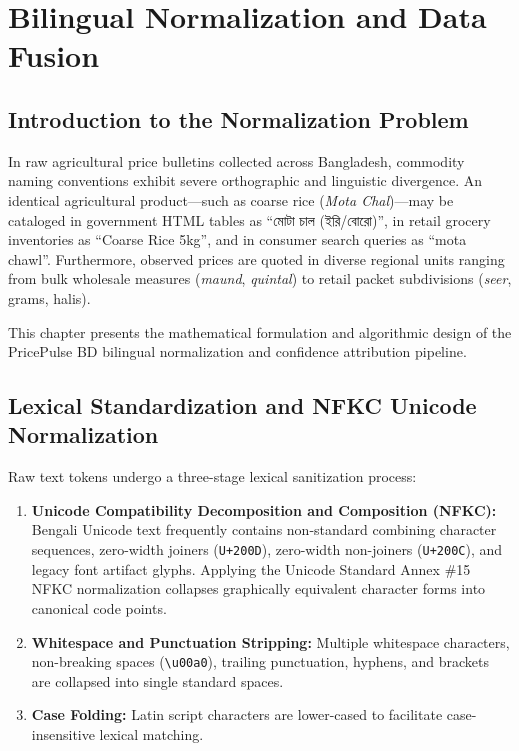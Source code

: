 \chapter{Bilingual Normalization and Data Fusion}
\label{ch:data_normalization}

\section{Introduction to the Normalization Problem}
In raw agricultural price bulletins collected across Bangladesh, commodity naming conventions exhibit severe orthographic and linguistic divergence. An identical agricultural product—such as coarse rice (\textit{Mota Chal})—may be cataloged in government HTML tables as ``মোটা চাল (ইরি/বোরো)'', in retail grocery inventories as ``Coarse Rice 5kg'', and in consumer search queries as ``mota chawl''. Furthermore, observed prices are quoted in diverse regional units ranging from bulk wholesale measures (\textit{maund}, \textit{quintal}) to retail packet subdivisions (\textit{seer}, grams, halis).

This chapter presents the mathematical formulation and algorithmic design of the PricePulse BD bilingual normalization and confidence attribution pipeline.

\section{Lexical Standardization and NFKC Unicode Normalization}
Raw text tokens undergo a three-stage lexical sanitization process:
\begin{enumerate}
    \item \textbf{Unicode Compatibility Decomposition and Composition (NFKC):} Bengali Unicode text frequently contains non-standard combining character sequences, zero-width joiners (\texttt{U+200D}), zero-width non-joiners (\texttt{U+200C}), and legacy font artifact glyphs. Applying the Unicode Standard Annex \#15 NFKC normalization collapses graphically equivalent character forms into canonical code points.
    \item \textbf{Whitespace and Punctuation Stripping:} Multiple whitespace characters, non-breaking spaces (\texttt{\textbackslash u00a0}), trailing punctuation, hyphens, and brackets are collapsed into single standard spaces.
    \item \textbf{Case Folding:} Latin script characters are lower-cased to facilitate case-insensitive lexical matching.
\end{enumerate}


